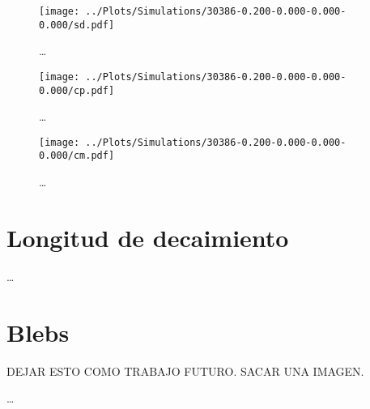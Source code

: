 \begin{figure}
    \centering
    \texttt{[image: ../Plots/Simulations/30386-0.200-0.000-0.000-0.000/sd.pdf]}
    \caption{\dots}
    \label{fig:sd_i}
\end{figure}

\begin{figure}
    \centering
    \texttt{[image: ../Plots/Simulations/30386-0.200-0.000-0.000-0.000/cp.pdf]}
    \caption{\dots}
    \label{fig:cp_i}
\end{figure}

\begin{figure}
    \centering
    \texttt{[image: ../Plots/Simulations/30386-0.200-0.000-0.000-0.000/cm.pdf]}
    \caption{\dots}
    \label{fig:cm_i}
\end{figure}

\section{Longitud de decaimiento}

\dots

\section{Blebs}

DEJAR ESTO COMO TRABAJO FUTURO. SACAR UNA IMAGEN.

\dots
